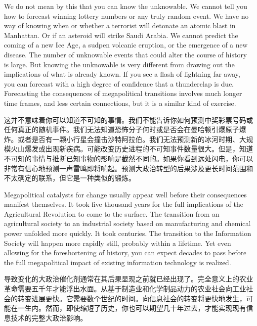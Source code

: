\begin{Parallel}{97mm}{72mm}
  \ParallelLText
  {We do not mean by this that you can know the unknowable. We cannot tell you how to forecast winning lottery numbers or any truly random event. We have no way of knowing when or whether a terrorist will detonate an atomic blast in Manhattan. Or if an asteroid will strike Saudi Arabia. We cannot predict the coming of a new Ice Age, a sudpen volcanic eruption, or the emergence of a new disease. The number of unknowable events that could alter the course of history is large. But knowing the unknowable is very different from drawing out the implications of what is already known. If you see a flash of lightning far away, you can forecast with a high degree of confidence that a thunderclap is due. Forecasting the consequences of megapolitical transitions involves much longer time frames, and less certain connections, but it is a similar kind of exercise.}
  
  \ParallelRText
  {这并不意味着你可以知道不可知的事情。我们不能告诉你如何预测中奖彩票号码或任何真正的随机事件。我们无法知道恐怖分子何时或是否会在曼哈顿引爆原子爆炸。或者是否有一颗小行星会撞击沙特阿拉伯。我们无法预测新的冰河时期、大规模火山爆发或出现新疾病。可能改变历史进程的不可知事件数量很大。但是，知道不可知的事情与推断已知事物的影响是截然不同的。如果你看到远处闪电，你可以非常有信心地预测一声雷鸣即将响起。预测大政治转型的后果涉及更长时间范围和不太确定的联系，但它是一种类似的锻炼。}
  \ParallelPar



  \ParallelLText
  {Megapolitical catalysts for change usually appear well before their consequences manifest themselves. It took five thousand years for the full implications of the Agricultural Revolution to come to the surface. The transition from an agricultural society to an industrial society based on manufacturing and chemical power unfolded more quickly. It took centuries. The transition to the Information Society will happen more rapidly still, probably within a lifetime. Yet even allowing for the foreshortening of history, you can expect decades to pass before the full megapolitical impact of existing information technology is realized.}
  
  \ParallelRText
  {导致变化的大政治催化剂通常在其后果显现之前就已经出现了。完全意义上的农业革命需要五千年才能浮出水面。从基于制造业和化学制品动力的农业社会向工业社会的转变进展更快。它需要数个世纪的时间。向信息社会的转变将更快地发生，可能在一生内。然而，即使缩短了历史，你也可以期望几十年过去，才能实现现有信息技术的完整大政治影响。}
  \ParallelPar


\end{Parallel}

